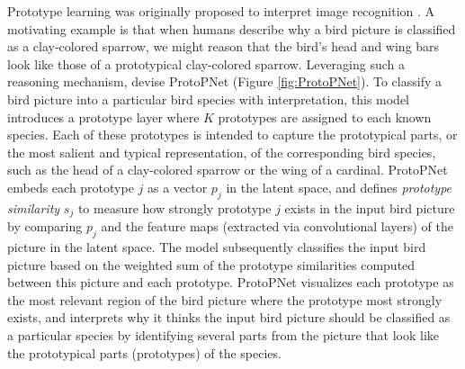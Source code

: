 \documentclass[mnsc]{informs3b} %
\begin{document}
Prototype learning was originally proposed to interpret image recognition \citep{chen_this_2019}. A motivating example is that when humans describe why a bird picture is classified as a clay-colored sparrow, we might reason that the bird’s head and wing bars look like those of a prototypical clay-colored sparrow. Leveraging such a reasoning mechanism, \cite{chen_this_2019} devise ProtoPNet (Figure \ref{fig:ProtoPNet}). 
To classify a bird picture into a particular bird species with interpretation, this model introduces a prototype layer where $K$ prototypes are assigned to each known species. Each of these prototypes is intended to capture the prototypical parts, or the most salient and typical representation, of the corresponding bird species, such as the head of a clay-colored sparrow or the wing of a cardinal. ProtoPNet embeds each prototype $j$ as a vector $p_j$ in the latent space, and defines \textit{prototype similarity} $s_j$ to measure how strongly prototype $j$ exists in the input bird picture by comparing $p_j$ and the feature maps (extracted via convolutional layers) of the picture in the latent space. The model subsequently classifies the input bird picture based on the weighted sum of the prototype similarities computed between this picture and each prototype. 
ProtoPNet visualizes each prototype as the most relevant region of the bird picture where the prototype most strongly exists, and interprets why it thinks the input bird picture should be classified as a particular species by identifying several parts from the picture that look like the prototypical parts (prototypes) of the species.
\end{document}
